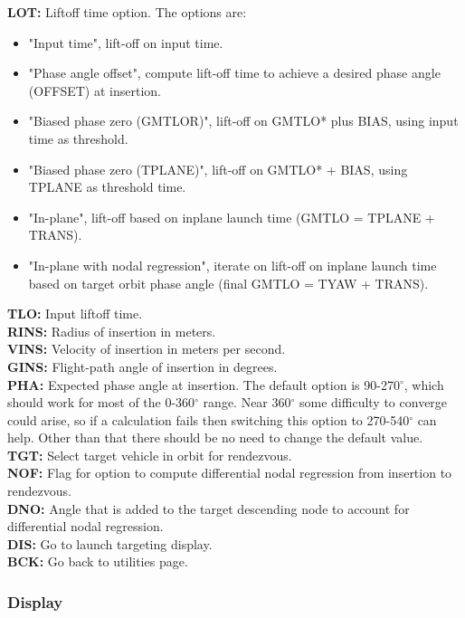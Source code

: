 \documentclass[11pt]{article} %
\begin{document}
\textbf{LOT:} Liftoff time option. The options are: 

\begin{itemize}
\item{"Input time", lift-off on input time.}
\item{"Phase angle offset", compute lift-off time to achieve a desired phase angle (OFFSET) at insertion.}
\item{"Biased phase zero (GMTLOR)", lift-off on GMTLO* plus BIAS, using input time as threshold.}
\item{"Biased phase zero (TPLANE)", lift-off on GMTLO* + BIAS, using TPLANE as threshold time.}
\item{"In-plane", lift-off based on inplane launch time (GMTLO = TPLANE + TRANS).}
\item{"In-plane with nodal regression", iterate on lift-off on inplane launch time based on target orbit phase angle (final GMTLO = TYAW + TRANS).}
\end{itemize}

\textbf{TLO:} Input liftoff time.\\
\textbf{RINS:} Radius of insertion in meters.\\
\textbf{VINS:} Velocity of insertion in meters per second.\\
\textbf{GINS:} Flight-path angle of insertion in degrees.\\
\textbf{PHA:} Expected phase angle at insertion. The default option is 90-270$^{\circ}$, which should work for most of the 0-360$^{\circ}$ range. Near 360$^{\circ}$ some difficulty to converge could arise, so if a calculation fails then switching this option to 270-540$^{\circ}$ can help. Other than that there should be no need to change the default value.\\

\textbf{TGT:} Select target vehicle in orbit for rendezvous.\\
\textbf{NOF:} Flag for option to compute differential nodal regression from insertion to rendezvous.\\
\textbf{DNO:} Angle that is added to the target descending node to account for differential nodal regression.\\
\textbf{DIS:} Go to launch targeting display.\\ 
\textbf{BCK:} Go back to utilities page.\\

\newpage
\subsubsection{Display}
\end{document}
